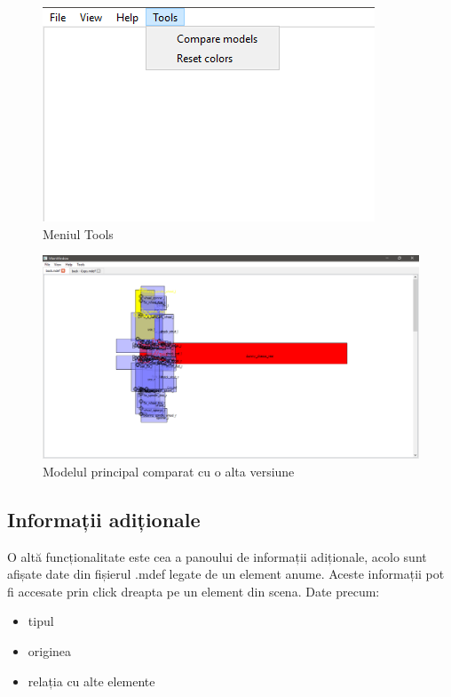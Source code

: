 \begin{figure}[H]
    \begin{center}
    \includegraphics[scale=0.5]{imagini/implementare/toolsmenu.png}
    \end{center}
    \caption{Meniul Tools}
    \label{fig:tabs}
\end{figure}

\begin{figure}[H]
    \includegraphics[width=\linewidth]{imagini/implementare/compare.png}
    \caption{Modelul principal comparat cu o alta versiune}
    \label{fig:tabs}
\end{figure}

\subsection{Informații adiționale}
O altă funcționalitate este cea a panoului de informații adiționale, acolo sunt afișate date din fișierul .mdef legate de un element 
anume. Aceste informații pot fi accesate prin click dreapta pe un element din scena. 
Date precum: 
\begin{itemize}
    \item tipul 
    \item originea
    \item relația cu alte elemente
\end{itemize}

